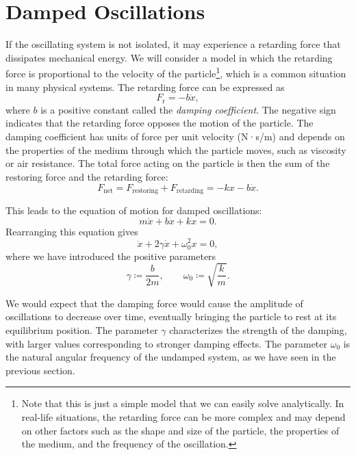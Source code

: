 \documentclass[12pt]{article}
\begin{document}
\section{Damped Oscillations}  
If the oscillating system is not isolated, it may experience a retarding force that dissipates mechanical energy. We will consider a model in which the retarding force is proportional to the velocity of the particle\footnote{Note that this is just a simple model that we can easily solve analytically. In real-life situations, the retarding force can be more complex and may depend on other factors such as the shape and size of the particle, the properties of the medium, and the frequency of the oscillation.}, which is a common situation in many physical systems. The retarding force can be expressed as
\begin{equation}
    F_\text{r}=-b\dot{x},
\end{equation}
where $b$ is a positive constant called the \textit{damping coefficient}. The negative sign indicates that the retarding force opposes the motion of the particle. The damping coefficient has units of force per unit velocity (N·s/m) and depends on the properties of the medium through which the particle moves, such as viscosity or air resistance. The total force acting on the particle is then the sum of the restoring force and the retarding force:
\begin{equation}
    F_\text{net}=F_\text{restoring}+F_\text{retarding}=-kx-b\dot{x}.
\end{equation}

This leads to the equation of motion for damped oscillations:
\begin{equation}
    m\ddot{x}+b\dot{x}+kx=0.
\end{equation}
Rearranging this equation gives
\begin{equation}
    \ddot{x}+2\gamma\dot{x}+\omega_0^2 x=0,
    \label{eq:damped-osc-eq-of-motion}
\end{equation}
where we have introduced the positive parameters
\begin{equation}
    \gamma\coloneqq \frac{b}{2m},
    \qquad
    \omega_0\coloneqq \sqrt{\frac{k}{m}}.
\end{equation}

We would expect that the damping force would cause the amplitude of oscillations to decrease over time, eventually bringing the particle to rest at its equilibrium position. The parameter $\gamma$ characterizes the strength of the damping, with larger values corresponding to stronger damping effects. The parameter $\omega_0$ is the natural angular frequency of the undamped system, as we have seen in the previous section.
\end{document}

